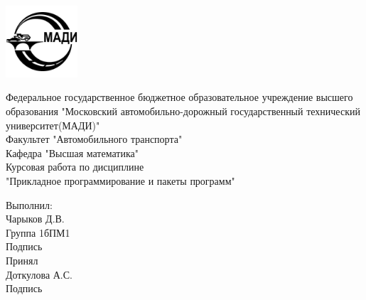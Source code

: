 \begin{titlepage}
\begin{center}
\includegraphics[width=0.2\textwidth]{university_logo.jpg}
\end{center}

\begin{center}
\LARGE
Федеральное государственное бюджетное образовательное 
учреждение высшего образования "Московский автомобильно-дорожный 
государственный технический университет(МАДИ)"\\

\vspace{2cm}
Факультет "Автомобильного транспорта"\\
Кафедра "Высшая математика"\\


\vspace{2cm}
Курсовая работа по дисциплине\\
"Прикладное программирование и пакеты программ"\\
\end{center}

\vfill
\begin{flushright}
    
Выполнил:\\
Чарыков Д.В.\\
Группа 1бПМ1\\
Подпись\\
\vspace{1cm}
Принял\\
Доткулова А.С.\\
\vspace{1cm}
Подпись
\end{flushright}
\end{titlepage}